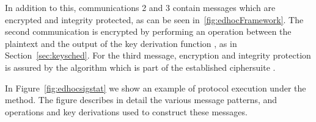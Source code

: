 In addition to this, communications 2 and 3 contain messages which are encrypted and integrity protected, as can be seen in~\ref{fig:edhocFramework}.
%
The second communication is encrypted by performing an \mXor{} operation between the plaintext and the output of the key derivation function \mHkdf{}, as in Section~\ref{sec:keysched}.
%
For the third message, encryption and integrity protection is assured by the \mAead{} algorithm which is part of the established ciphersuite \mSuites{}.

In Figure~\ref{fig:edhocsigstat} we show an example of protocol execution under the \mSigStat{} method. 
%
The figure describes in detail the various message patterns, and operations and key derivations used to construct these messages.

